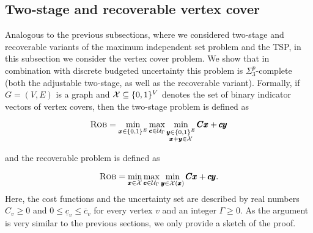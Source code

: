 \subsection{Two-stage and recoverable vertex cover}
\label{subsec:vertexcover}

Analogous to the previous subsections, where we considered two-stage and recoverable variants of the maximum independent set problem and the TSP, in this subsection we consider the vertex cover problem. We show that in combination with discrete budgeted uncertainty this problem is $\Sigma_3^p$-complete (both the adjustable two-stage, as well as the recoverable variant). 
Formally, if $G = (V,E)$ is a graph and $\mathcal{X} \subseteq \{ 0,1 \}^V $ denotes the set of binary indicator vectors of vertex covers, then the two-stage problem is defined as

\begin{equation*}
\textsc{Rob} = \min_{\pmb x \in \{ 0,1 \}^E} \max_{\pmb c \in \mathcal{U}_\Gamma } \min_{\substack{\pmb y \in \{ 0,1 \}^E\\ \pmb x+ \pmb y \in \mathcal{X}}} \pmb C \pmb x + \pmb c \pmb y 
\end{equation*} 

and the recoverable problem is defined as

\begin{equation*}
\textsc{Rob} = \min_{\pmb x \in \mathcal{X}} \max_{\pmb c \in \mathcal{U}_\Gamma } \min_{\pmb y \in \mathcal{X}(\pmb x)} \pmb C \pmb x + \pmb c \pmb y. 
\end{equation*} 
Here, the cost functions and the uncertainty set are described by real numbers $C_v \geq 0$ and  $0 \leq \underline{c}_v \leq \overline{c}_v$ for every vertex $v$ and an integer $\Gamma \geq 0$. 
As the argument is very similar to the previous sections, we only provide a sketch of the proof.

